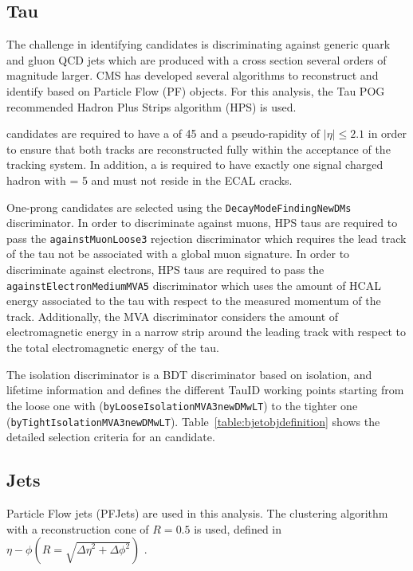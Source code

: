 \subsection{Tau}
\label{subsec::objsel_tau}

The challenge in identifying \hadtau candidates is discriminating against generic quark and gluon QCD jets which are produced with a cross section several orders of magnitude larger. CMS has developed several algorithms to reconstruct and identify \hadtau based on Particle Flow (PF) objects. For this analysis, the Tau POG recommended Hadron Plus Strips algorithm (HPS) is used. 

\hadtau candidates are required to have a \pt of 45 \gev and a pseudo-rapidity of $|\eta| \le 2.1$ in order to ensure that both tracks are reconstructed fully within the acceptance of the tracking system. In addition, a \hadtau is required to have exactly one signal charged hadron with \pt = 5 \gev and must not reside in the ECAL cracks.

One-prong \hadtau candidates are selected using the \texttt{Decay\-Mode\-Finding\-New\-DMs} discriminator. In order to discriminate against muons, HPS taus are required to pass the \texttt{against\-Muon\-Loose3} rejection discriminator which requires the lead track of the tau not be associated with a global muon signature. In order to discriminate against electrons, HPS taus are required to pass the \texttt{against\-Electron\-Medium\-MVA5} discriminator which uses the amount of HCAL energy associated to the tau with respect to the measured momentum of the track. Additionally, the MVA discriminator considers the amount of electromagnetic energy in a narrow strip around the leading track with respect to the total electromagnetic energy of the tau. 

The isolation discriminator is a BDT \cite{Hocker:2007ht} discriminator based on isolation, \pt and \hadtau lifetime information and defines the different TauID working points starting from the loose one with (\texttt{byLoose\-Isolation\-MVA3\-newDMwLT}) to the tighter one (\texttt{byTight\-Isolation\-MVA3new\-DMwLT}). Table~\ref{table:bjetobjdefinition} shows the detailed selection criteria for an \hadtau candidate.

\subsection{Jets}
\label{subsec::objsel_jet}

Particle Flow jets (PFJets) are used in this analysis. The \antikt clustering algorithm with a reconstruction cone of \ensuremath{R = 0.5} is used, defined in \ensuremath{\eta-\phi (R = \sqrt{{\Delta \eta}^2 + {\Delta \phi}^{2}})} \cite{1126-6708-2008-04-063}. 

